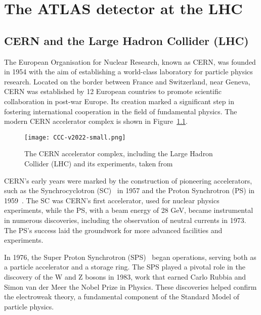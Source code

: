 \chapter{The ATLAS detector at the LHC}


\graphicspath{{1_MainChapters/Chap3_ATLAS/Figs}}

\section{CERN and the Large Hadron Collider (LHC)}
    The European Organisation for Nuclear Research, known as CERN, was founded in 1954 with the aim of establishing 
    a world-class laboratory for particle physics research. Located on the border between France and Switzerland, 
    near Geneva, CERN was established by 12 European countries to promote scientific collaboration in post-war Europe. 
    Its creation marked a significant step in fostering international cooperation in the field of fundamental physics.
    The modern CERN accelerator complex is shown in Figure~\ref{fig:LHC}.
    \begin{figure}[t]
        \centering
        \texttt{[image: CCC-v2022-small.png]}
        \caption{The CERN accelerator complex, including the Large Hadron Collider (LHC) and its experiments, taken from~\cite{CERNAccComp}}
        \label{fig:LHC}
    \end{figure}

    CERN's early years were marked by the construction of pioneering accelerators, such as the Synchrocyclotron (SC)~\cite{Synchro-CyclotronDivision:1606751}
    in 1957 and the Proton Synchrotron (PS) in 1959~\cite{ADAMS1960}. The SC was CERN's first accelerator, used for nuclear physics 
    experiments, while the PS, with a beam energy of 28 GeV, became instrumental in numerous discoveries, including 
    the observation of neutral currents in 1973. The PS's success laid the groundwork for more advanced facilities 
    and experiments.

    In 1976, the Super Proton Synchrotron (SPS)~\cite{Doble:2312568} began operations, serving both as a particle accelerator and a storage 
    ring. The SPS played a pivotal role in the discovery of the W and Z bosons in 1983, work that earned Carlo Rubbia 
    and Simon van der Meer the Nobel Prize in Physics. These discoveries helped confirm the electroweak theory, a fundamental 
    component of the Standard Model of particle physics.

